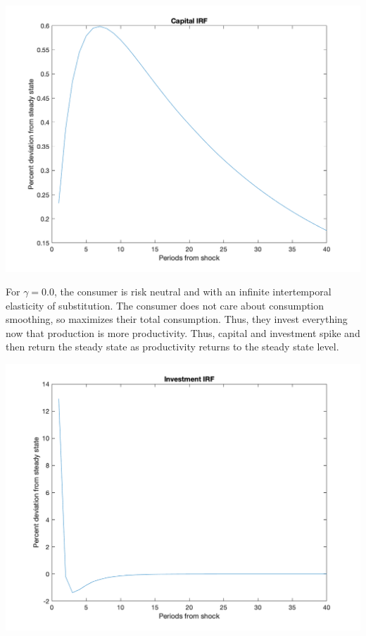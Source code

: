 \documentclass{article}
\begin{document}
\includegraphics[scale=.6]{p2_k}

For $\gamma = 0.0$, the consumer is risk neutral and with an infinite intertemporal elasticity of substitution.  The consumer does not care about consumption smoothing, so maximizes their total consumption. Thus, they invest everything now that production is more productivity. Thus, capital and investment spike and then return the steady state as productivity returns to the steady state level.

\includegraphics[scale=.6]{p2_i_zero_gamma}
\end{document}
